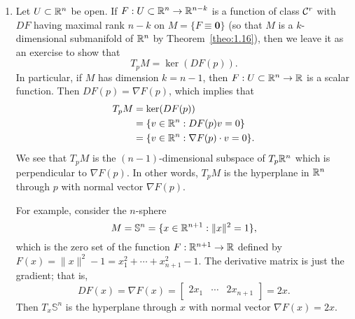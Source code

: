\begin{enumerate}[(1)]
    \item Let $U \subset \mathbb{R}^n$ be open. If $F : U \subset \mathbb{R}^n \to \mathbb{R}^{n-k}$ is a function of 
    class ${\cal C}^r$ with $DF$ having maximal rank $n-k$ on $M = \{F \equiv \mathbf 0\}$ 
    (so that $M$ is a $k$-dimensional submanifold of $\mathbb{R}^n$ by Theorem~\ref{theo:1.16}), 
    then we leave it as an exercise to show that 
    \[ T_pM = \ker(DF(p)). \] 
    In particular, if $M$ has dimension $k = n-1$, then $F : U \subset \mathbb{R}^n \to \mathbb{R}$ is a 
    scalar function. Then $DF(p) = \nabla F(p)$, which implies that 
    \begin{align*}
        T_pM &= \ker(DF(p)) \\ 
        &= \{v \in \mathbb{R}^n : DF(p)v = 0\} \\ 
        &= \{v \in \mathbb{R}^n : \nabla F(p) \cdot v = 0\}.
    \end{align*}
    We see that $T_pM$ is the $(n-1)$-dimensional subspace of $T_p\mathbb{R}^n$ 
    which is perpendicular to $\nabla F(p)$. In other words, $T_pM$ is the 
    hyperplane in $\mathbb{R}^n$ through $p$ with normal vector $\nabla F(p)$. 

    For example, consider the $n$-sphere 
    \[ M = \mathbb{S}^n = \{x \in \mathbb{R}^{n+1} : \|x\|^2 = 1\}, \] 
    which is the zero set of the function $F : \mathbb{R}^{n+1} \to \mathbb{R}$ defined by $F(x) = \|x\|^2 - 1 
    = x_1^2 + \cdots + x_{n+1}^2 - 1$. The derivative matrix is just the gradient; that is, 
    \[ DF(x) = \nabla F(x) = \begin{bmatrix} 2x_1 & \cdots & 2x_{n+1} \end{bmatrix} = 2x. \]
    Then $T_x\mathbb{S}^n$ is the hyperplane through $x$ with normal 
    vector $\nabla F(x) = 2x$.  
\end{enumerate}